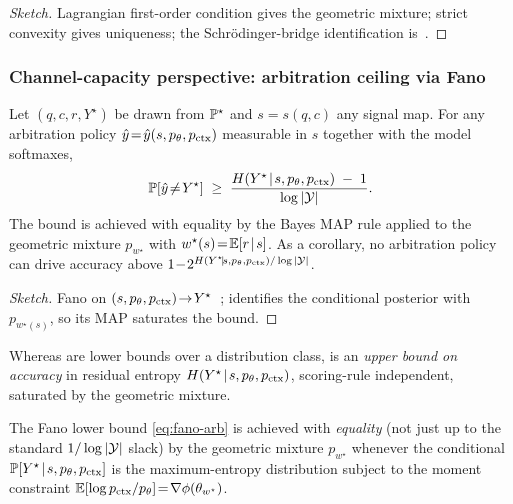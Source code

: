 \begin{proof}[Sketch]
Lagrangian first-order condition gives the geometric mixture;
strict convexity gives uniqueness; the Schrödinger-bridge
identification is~\citet[Prop.~4.1]{leonard2014survey}.
\end{proof}

\subsubsection{Channel-capacity perspective: arbitration ceiling via Fano}
\label{app:arbitration-capacity}

\begin{theorem}
\label{thm:arbitration-capacity}
Let $(q,c,r,Y^\star)$ be drawn from $\mathbb{P}^\star$ and $s\!=\!s(q,c)$
any signal map.  For any arbitration policy
$\hat y\!=\!\hat y(s,p_\theta,p_{\mathrm{ctx}})$ measurable in $s$ together
with the model softmaxes,
\begin{equation}
\mathbb{P}[\hat y\!\ne\! Y^\star]
\;\ge\;
\frac{H(Y^\star\!\mid\! s,p_\theta,p_{\mathrm{ctx}})\;-\;1}{\log|\mathcal{Y}|}.
\label{eq:fano-arb}
\end{equation}
The bound is achieved with equality by the Bayes MAP rule
applied to the geometric mixture $p_{w^\star}$ with
$w^\star(s)\!=\!\mathbb{E}[r\!\mid\!s]$.  As a corollary, no arbitration
policy can drive accuracy above
$1\!-\!2^{H(Y^\star\!\mid\!s,p_\theta,p_{\mathrm{ctx}})/\log|\mathcal{Y}|}$.
\end{theorem}

\begin{proof}[Sketch]
Fano on $(s,p_\theta,p_{\mathrm{ctx}})\!\to\!Y^\star$~\citep[Thm.~2.10.1]{cover2006elements};
 identifies the conditional posterior
with $p_{w^\star(s)}$, so its MAP saturates the bound.
\end{proof}

Whereas  are lower bounds over a
distribution class,  is an
\emph{upper bound on accuracy} in residual entropy
$H(Y^\star\!\mid\!s,p_\theta,p_{\mathrm{ctx}})$, scoring-rule independent,
saturated by the geometric mixture.

\begin{corollary}
\label{cor:fano-equality}
The Fano lower bound \eqref{eq:fano-arb} is achieved with
\emph{equality} (not just up to the standard $1/\log|\mathcal{Y}|$ slack)
by the geometric mixture $p_{w^\star}$ whenever the conditional
$\mathbb{P}[Y^\star\!\mid\!s,p_\theta,p_{\mathrm{ctx}}]$ is the maximum-entropy
distribution subject to the moment constraint
$\mathbb{E}[\log p_{\mathrm{ctx}}/p_\theta]\!=\!\nabla\phi(\theta_{w^\star})$.
\end{corollary}

